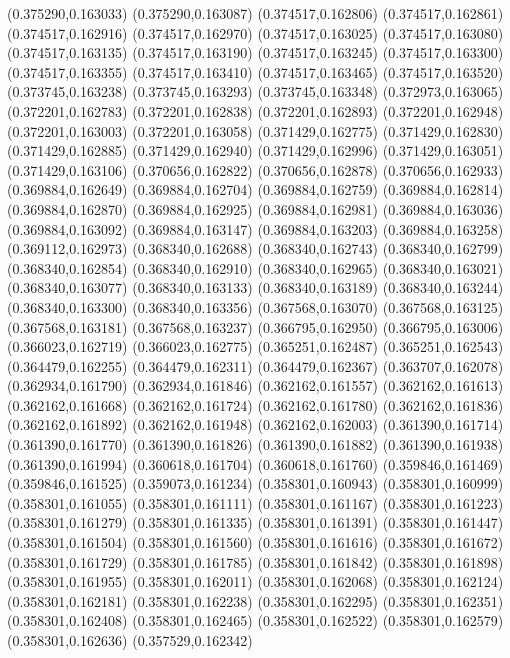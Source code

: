 (0.375290,0.163033)
(0.375290,0.163087)
(0.374517,0.162806)
(0.374517,0.162861)
(0.374517,0.162916)
(0.374517,0.162970)
(0.374517,0.163025)
(0.374517,0.163080)
(0.374517,0.163135)
(0.374517,0.163190)
(0.374517,0.163245)
(0.374517,0.163300)
(0.374517,0.163355)
(0.374517,0.163410)
(0.374517,0.163465)
(0.374517,0.163520)
(0.373745,0.163238)
(0.373745,0.163293)
(0.373745,0.163348)
(0.372973,0.163065)
(0.372201,0.162783)
(0.372201,0.162838)
(0.372201,0.162893)
(0.372201,0.162948)
(0.372201,0.163003)
(0.372201,0.163058)
(0.371429,0.162775)
(0.371429,0.162830)
(0.371429,0.162885)
(0.371429,0.162940)
(0.371429,0.162996)
(0.371429,0.163051)
(0.371429,0.163106)
(0.370656,0.162822)
(0.370656,0.162878)
(0.370656,0.162933)
(0.369884,0.162649)
(0.369884,0.162704)
(0.369884,0.162759)
(0.369884,0.162814)
(0.369884,0.162870)
(0.369884,0.162925)
(0.369884,0.162981)
(0.369884,0.163036)
(0.369884,0.163092)
(0.369884,0.163147)
(0.369884,0.163203)
(0.369884,0.163258)
(0.369112,0.162973)
(0.368340,0.162688)
(0.368340,0.162743)
(0.368340,0.162799)
(0.368340,0.162854)
(0.368340,0.162910)
(0.368340,0.162965)
(0.368340,0.163021)
(0.368340,0.163077)
(0.368340,0.163133)
(0.368340,0.163189)
(0.368340,0.163244)
(0.368340,0.163300)
(0.368340,0.163356)
(0.367568,0.163070)
(0.367568,0.163125)
(0.367568,0.163181)
(0.367568,0.163237)
(0.366795,0.162950)
(0.366795,0.163006)
(0.366023,0.162719)
(0.366023,0.162775)
(0.365251,0.162487)
(0.365251,0.162543)
(0.364479,0.162255)
(0.364479,0.162311)
(0.364479,0.162367)
(0.363707,0.162078)
(0.362934,0.161790)
(0.362934,0.161846)
(0.362162,0.161557)
(0.362162,0.161613)
(0.362162,0.161668)
(0.362162,0.161724)
(0.362162,0.161780)
(0.362162,0.161836)
(0.362162,0.161892)
(0.362162,0.161948)
(0.362162,0.162003)
(0.361390,0.161714)
(0.361390,0.161770)
(0.361390,0.161826)
(0.361390,0.161882)
(0.361390,0.161938)
(0.361390,0.161994)
(0.360618,0.161704)
(0.360618,0.161760)
(0.359846,0.161469)
(0.359846,0.161525)
(0.359073,0.161234)
(0.358301,0.160943)
(0.358301,0.160999)
(0.358301,0.161055)
(0.358301,0.161111)
(0.358301,0.161167)
(0.358301,0.161223)
(0.358301,0.161279)
(0.358301,0.161335)
(0.358301,0.161391)
(0.358301,0.161447)
(0.358301,0.161504)
(0.358301,0.161560)
(0.358301,0.161616)
(0.358301,0.161672)
(0.358301,0.161729)
(0.358301,0.161785)
(0.358301,0.161842)
(0.358301,0.161898)
(0.358301,0.161955)
(0.358301,0.162011)
(0.358301,0.162068)
(0.358301,0.162124)
(0.358301,0.162181)
(0.358301,0.162238)
(0.358301,0.162295)
(0.358301,0.162351)
(0.358301,0.162408)
(0.358301,0.162465)
(0.358301,0.162522)
(0.358301,0.162579)
(0.358301,0.162636)
(0.357529,0.162342)
